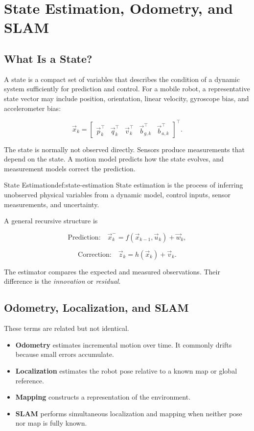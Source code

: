 \chapter{State Estimation, Odometry, and SLAM}
\label{chap:state-estimation}

\section{What Is a State?}

A state is a compact set of variables that describes the condition of a dynamic system sufficiently for prediction and control. For a mobile robot, a representative state vector may include position, orientation, linear velocity, gyroscope bias, and accelerometer bias:

\[
    \vec{x}_k =
    \begin{bmatrix}
        \vec{p}_k^\top &
        \vec{q}_k^\top &
        \vec{v}_k^\top &
        \vec{b}_{g,k}^\top &
        \vec{b}_{a,k}^\top
    \end{bmatrix}^{\top}.
\]

The state is normally not observed directly. Sensors produce measurements that depend on the state. A motion model predicts how the state evolves, and measurement models correct the prediction.

\begin{definition}{State Estimation}{def:state-estimation}
State estimation is the process of inferring unobserved physical variables from a dynamic model, control inputs, sensor measurements, and uncertainty.
\end{definition}

A general recursive structure is

\[
    \text{Prediction:}\quad
    \vec{x}_{k}^{-}=f(\vec{x}_{k-1},\vec{u}_{k}) + \vec{w}_{k},
\]

\[
    \text{Correction:}\quad
    \vec{z}_{k}=h(\vec{x}_{k})+\vec{v}_{k}.
\]

The estimator compares the expected and measured observations. Their difference is the \emph{innovation} or \emph{residual}.

\section{Odometry, Localization, and SLAM}

These terms are related but not identical.

\begin{itemize}
    \item \textbf{Odometry} estimates incremental motion over time. It commonly drifts because small errors accumulate.
    \item \textbf{Localization} estimates the robot pose relative to a known map or global reference.
    \item \textbf{Mapping} constructs a representation of the environment.
    \item \textbf{SLAM} performs simultaneous localization and mapping when neither pose nor map is fully known.
\end{itemize}

